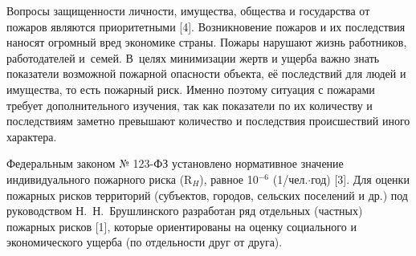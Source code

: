 



\makeProcTitleII
{}

Вопросы защищенности личности, имущества, общества и государства от пожаров являются приоритетными [4]. Возникновение пожаров и их последствия наносят огромный вред экономике страны. Пожары нарушают жизнь работников, работодателей и семей. В~целях минимизации жертв и ущерба важно знать показатели возможной пожарной опасности объекта, её последствий для людей и имущества, то есть пожарный риск. Именно поэтому ситуация с пожарами требует дополнительного изучения, так как показатели по их количеству и последствиям заметно превышают количество и последствия происшествий иного характера.

Федеральным законом № 123-ФЗ установлено нормативное значение индивидуального пожарного риска (R$_H$), равное 10$^{-6}$ (1/чел.$\cdot$год) [3]. Для оценки пожарных рисков территорий (субъектов, городов, сельских поселений и др.) под руководством Н.~Н.~Брушлинского разработан ряд отдельных (частных) пожарных рисков [1], которые ориентированы на оценку социального и экономического ущерба (по отдельности друг от друга).


